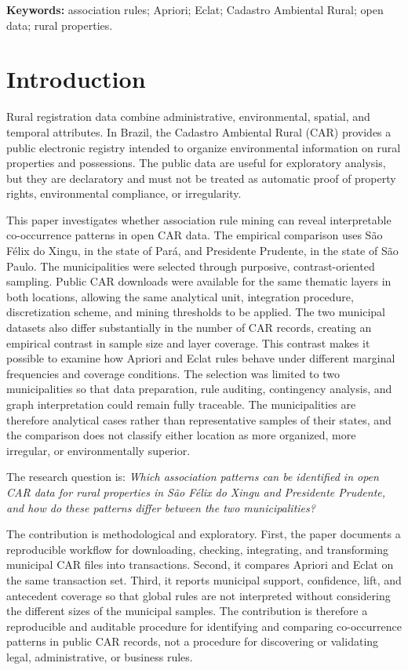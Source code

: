 \documentclass[11pt]{article}
\begin{document}
\noindent\textbf{Keywords:} association rules; Apriori; Eclat; Cadastro Ambiental Rural; open data; rural properties.

\section{Introduction}

Rural registration data combine administrative, environmental, spatial, and temporal attributes. In Brazil, the Cadastro Ambiental Rural (CAR) provides a public electronic registry intended to organize environmental information on rural properties and possessions. The public data are useful for exploratory analysis, but they are declaratory and must not be treated as automatic proof of property rights, environmental compliance, or irregularity.

This paper investigates whether association rule mining can reveal interpretable co-occurrence patterns in open CAR data. The empirical comparison uses São Félix do Xingu, in the state of Pará, and Presidente Prudente, in the state of São Paulo. The municipalities were selected through purposive, contrast-oriented sampling. Public CAR downloads were available for the same thematic layers in both locations, allowing the same analytical unit, integration procedure, discretization scheme, and mining thresholds to be applied. The two municipal datasets also differ substantially in the number of CAR records, creating an empirical contrast in sample size and layer coverage. This contrast makes it possible to examine how Apriori and Eclat rules behave under different marginal frequencies and coverage conditions. The selection was limited to two municipalities so that data preparation, rule auditing, contingency analysis, and graph interpretation could remain fully traceable. The municipalities are therefore analytical cases rather than representative samples of their states, and the comparison does not classify either location as more organized, more irregular, or environmentally superior.

The research question is: \emph{Which association patterns can be identified in open CAR data for rural properties in São Félix do Xingu and Presidente Prudente, and how do these patterns differ between the two municipalities?}

The contribution is methodological and exploratory. First, the paper documents a reproducible workflow for downloading, checking, integrating, and transforming municipal CAR files into transactions. Second, it compares Apriori and Eclat on the same transaction set. Third, it reports municipal support, confidence, lift, and antecedent coverage so that global rules are not interpreted without considering the different sizes of the municipal samples. The contribution is therefore a reproducible and auditable procedure for identifying and comparing co-occurrence patterns in public CAR records, not a procedure for discovering or validating legal, administrative, or business rules.
\end{document}
